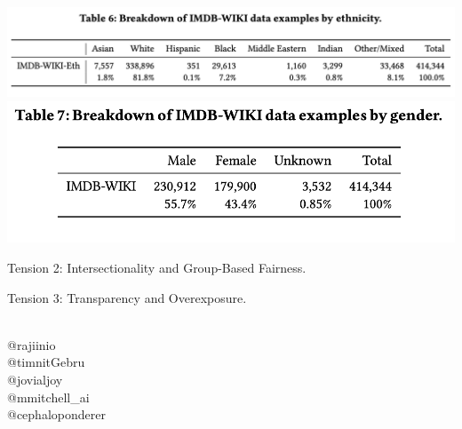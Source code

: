 \documentclass{beamer}
\begin{document}
\begin{frame}
    \centering
    \includegraphics[width=\textwidth]{static/table_six.png} \\ \vfill
    \includegraphics[width=.65\textwidth]{static/table_seven.png}
\end{frame}

\begin{frame}
    \begin{center}
    \LARGE{Tension 2: Intersectionality and Group-Based Fairness.}
    \end{center}
\end{frame}

\begin{frame}
    \begin{center}
    \LARGE{Tension 3: Transparency and Overexposure.}
    \end{center}
\end{frame}

\begin{frame}
	\begin{center}
    \faTwitter \\
    @rajiinio \\
    @timnitGebru \\
    @jovialjoy \\
    @mmitchell\_ai \\
    @cephaloponderer \\
	\end{center}
\end{frame}
\end{document}
